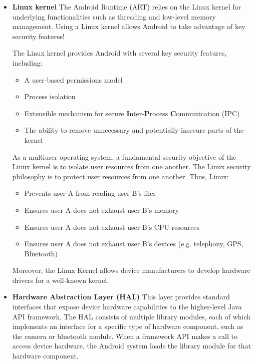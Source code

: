 \begin{itemize}
	\item \textbf{Linux kernel} The Android Runtime (ART) relies on the Linux kernel for underlying functionalities such as threading and low-level memory management.
		Using a Linux kernel allows Android to take advantage of key security features!
		
		The Linux kernel provides Android with several key security features, including:	
		\begin{itemize}
			\item A user-based permissions model
			\item Process isolation
			\item Extensible mechanism for secure \textbf{I}nter-\textbf{P}rocess \textbf{C}ommunication (IPC)
			\item The ability to remove unnecessary and potentially insecure parts of the kernel
		\end{itemize}
		As a multiuser operating system, a fundamental security objective of the Linux kernel is to isolate user resources from one another.
		The Linux security philosophy is to protect user resources from one another.
		Thus, Linux:	
		\begin{itemize}
			\item Prevents user A from reading user B's files
			\item Ensures user A does not exhaust user B's memory
			\item Ensures user A does not exhaust user B's CPU resources
			\item Ensures user A does not exhaust user B's devices (e.g. telephony, GPS, Bluetooth)
		\end{itemize}		
		Moreover, the Linux Kernel  allows device manufacturers to develop hardware drivers for a well-known kernel.
		
	\item \textbf{Hardware Abstraction Layer (HAL)} This layer provides standard interfaces that expose device hardware capabilities to the higher-level Java API framework.
		The HAL consists of multiple library modules, each of which implements an interface for a specific type of hardware component, such as the camera or bluetooth module.
		When a framework API makes a call to access device hardware, the Android system loads the library module for that hardware component.
		

\end{itemize}
